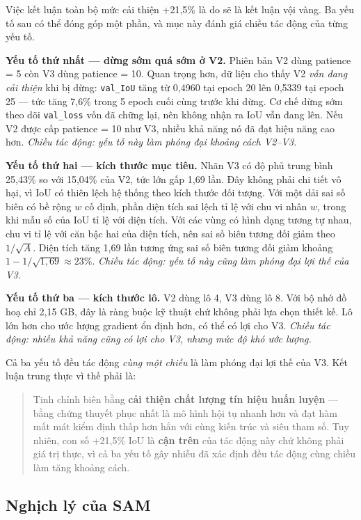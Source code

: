 Việc kết luận toàn bộ mức cải thiện +21,5\% là do \SAM{} sẽ là kết luận vội vàng.
Ba yếu tố sau có thể đóng góp một phần, và mục này đánh giá chiều tác động của
từng yếu tố.

\textbf{Yếu tố thứ nhất --- dừng sớm quá sớm ở V2.} Phiên bản V2 dùng patience = 5
còn V3 dùng patience = 10. Quan trọng hơn, dữ liệu cho thấy V2 \emph{vẫn đang cải
thiện} khi bị dừng: \texttt{val\_IoU} tăng từ 0,4960 tại epoch 20 lên 0,5339 tại
epoch 25 --- tức tăng 7,6\% trong 5 epoch cuối cùng trước khi dừng. Cơ chế dừng sớm
theo dõi \texttt{val\_loss} vốn đã chững lại, nên không nhận ra IoU vẫn đang lên.
Nếu V2 được cấp patience = 10 như V3, nhiều khả năng nó đã đạt hiệu năng cao hơn.
\emph{Chiều tác động: yếu tố này làm phóng đại khoảng cách V2--V3.}

\textbf{Yếu tố thứ hai --- kích thước mục tiêu.} Nhãn V3 có độ phủ trung bình
25,43\% so với 15,04\% của V2, tức lớn gấp 1,69 lần. Đây không phải chi tiết vô
hại, vì IoU có thiên lệch hệ thống theo kích thước đối tượng. Với một dải sai số
biên có bề rộng $w$ cố định, phần diện tích sai lệch tỉ lệ với chu vi nhân $w$,
trong khi mẫu số của IoU tỉ lệ với diện tích. Với các vùng có hình dạng tương tự
nhau, chu vi tỉ lệ với căn bậc hai của diện tích, nên sai số biên tương đối giảm
theo $1/\sqrt{A}$. Diện tích tăng 1,69 lần tương ứng sai số biên tương đối giảm
khoảng $1 - 1/\sqrt{1{,}69} \approx 23\%$. \emph{Chiều tác động: yếu tố này cũng
làm phóng đại lợi thế của V3.}

\textbf{Yếu tố thứ ba --- kích thước lô.} V2 dùng lô 4, V3 dùng lô 8. Với bộ nhớ
đồ hoạ chỉ 2,15 GB, đây là ràng buộc kỹ thuật chứ không phải lựa chọn thiết kế.
Lô lớn hơn cho ước lượng gradient ổn định hơn, có thể có lợi cho V3. \emph{Chiều
tác động: nhiều khả năng cũng có lợi cho V3, nhưng mức độ khó ước lượng.}

Cả ba yếu tố đều tác động \emph{cùng một chiều} là làm phóng đại lợi thế của V3.
Kết luận trung thực vì thế phải là:

\begin{quote}
Tinh chỉnh biên bằng \SAM{} \textbf{cải thiện chất lượng tín hiệu huấn luyện} ---
bằng chứng thuyết phục nhất là mô hình hội tụ nhanh hơn và đạt hàm mất mát kiểm
định thấp hơn hẳn với cùng kiến trúc và siêu tham số. Tuy nhiên, con số +21,5\%
IoU là \textbf{cận trên} của tác động này chứ không phải giá trị thực, vì cả ba
yếu tố gây nhiễu đã xác định đều tác động cùng chiều làm tăng khoảng cách.
\end{quote}

\subsection{Nghịch lý của SAM}

